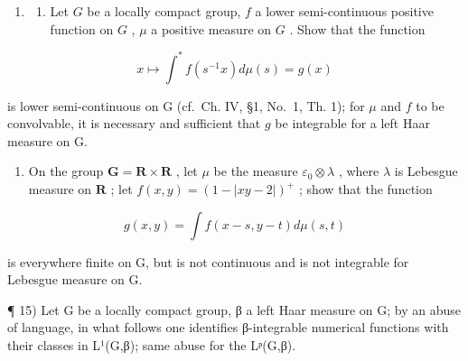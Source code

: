 \begin{enumerate}
\def\labelenumi{\arabic{enumi})}
\setcounter{enumi}{13}
\tightlist
\item
  \begin{enumerate}
  \def\labelenumii{\alph{enumii})}
  \tightlist
  \item
    Let \(G\) be a locally compact group, \(f\) a lower semi-continuous positive function on \(G\) , \(\mu\) a positive measure on \(G\) . Show that the function
  \end{enumerate}
\end{enumerate}

\[
x \mapsto \int^ {*} f (s ^ {- 1} x) d \mu (s) = g (x)
\]

is lower semi-continuous on G (cf.~Ch. IV, §1, No.~1, Th. 1); for \(\mu\) and \(f\) to be convolvable, it is necessary and sufficient that \(g\) be integrable for a left Haar measure on G.

\begin{enumerate}
\def\labelenumi{\alph{enumi})}
\setcounter{enumi}{1}
\tightlist
\item
  On the group \(\mathbf{G} = \mathbf{R} \times \mathbf{R}\) , let \(\mu\) be the measure \(\varepsilon_0 \otimes \lambda\) , where \(\lambda\) is Lebesgue measure on \(\mathbf{R}\) ; let \(f(x, y) = (1 - |xy - 2|)^+\) ; show that the function
\end{enumerate}

\[
g (x, y) = \int f (x - s, y - t) d \mu (s, t)
\]

is everywhere finite on G, but is not continuous and is not integrable for Lebesgue measure on G.

¶ 15) Let G be a locally compact group, β a left Haar measure on G; by an abuse of language, in what follows one identifies β-integrable numerical functions with their classes in L¹(G,β); same abuse for the Lᵖ(G,β).

